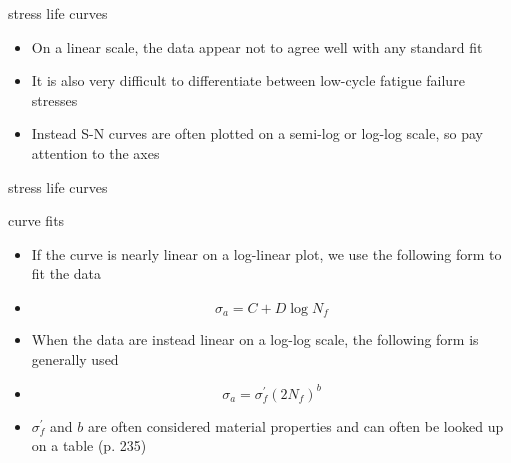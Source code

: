 \documentclass[10pt]{beamer}
\begin{document}
\begin{frame}{stress life curves}
	\begin{itemize}[<+->]
		\item On a linear scale, the data appear not to agree well with any standard fit
		\item It is also very difficult to differentiate between low-cycle fatigue failure stresses
		\item Instead S-N curves are often plotted on a semi-log or log-log scale, so pay attention to the axes
	\end{itemize}
\end{frame}

\begin{frame}{stress life curves}
\end{frame}

\begin{frame}{curve fits}
	\begin{itemize}[<+->]
		\item If the curve is nearly linear on a log-linear plot, we use the following form to fit the data
		\item \begin{equation}
		\sigma_a = C + D \log N_f
		\end{equation}
		\item When the data are instead linear on a log-log scale, the following form is generally used
		\item \begin{equation}
		\sigma_a = \sigma_f^\prime \left(2N_f\right)^b
		\end{equation}
		\item $\sigma_f^\prime$ and $b$ are often considered material properties and can often be looked up on a table (p. 235)
	\end{itemize}
\end{frame}
\end{document}
